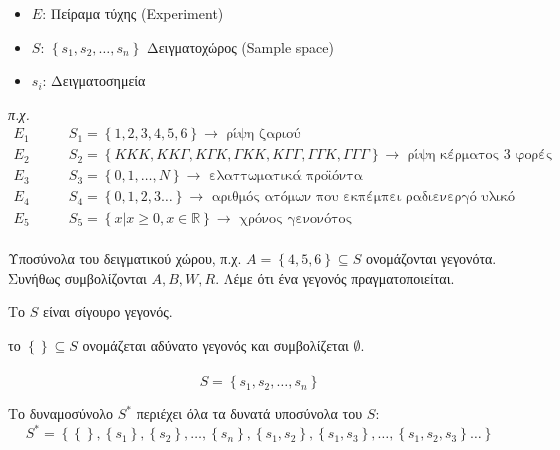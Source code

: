 \documentclass[11pt,a4paper,titlepage,draft]{article}
\newcommand{\textlatin}[1]{#1}
\begin{document}
\begin{itemize}
\item \(E\): Πείραμα τύχης (\textlatin{Experiment})
\item \(S\): \( \left\lbrace s_1,s_2, \dots , s_n \right\rbrace\) Δειγματοχώρος (\textlatin{Sample space})
\item \(s_i\): Δειγματοσημεία
\end{itemize}

\textit{π.χ.}
\begin{align*}
E_1 \qquad & S_1 = \left\lbrace 1,2,3,4,5,6 \right\rbrace \rightarrow \text{ ρίψη ζαριού}\\
E_2 \qquad & S_2 = \left\lbrace KKK, KK\Gamma , K\Gamma K, \Gamma K K, K \Gamma \Gamma, \Gamma \Gamma K, \Gamma \Gamma \Gamma \right\rbrace \rightarrow \text{ ρίψη κέρματος 3 φορές} \\
E_3 \qquad & S_3 = \left\lbrace 0,1,\dots,N \right\rbrace \rightarrow \text{ ελαττωματικά προϊόντα}\\
E_4 \qquad & S_4 = \left\lbrace 0,1,2,3\dots \right\rbrace \rightarrow \text{ αριθμός ατόμων που εκπέμπει ραδιενεργό υλικό}\\
E_5 \qquad & S_5 = \left\lbrace x | x \geq 0, x \in \mathbb R \right\rbrace \rightarrow \text{ χρόνος γενονότος}
\end{align*}

\paragraph{}
Υποσύνολα του δειγματικού χώρου, π.χ. \(A = \left\lbrace 4,5,6 \right\rbrace \subseteq S\) ονομάζονται γεγονότα. Συνήθως συμβολίζονται \(A,B,W,R\). Λέμε ότι ένα γεγονός πραγματοποιείται.

Το \(S\) είναι σίγουρο γεγονός.

το \(\left\lbrace \right\rbrace \subseteq S \) ονομάζεται αδύνατο γεγονός και συμβολίζεται \( \emptyset \).

\paragraph{}
\[S =  \left\lbrace s_1,s_2,\dots,s_n  \right\rbrace \]

Το δυναμοσύνολο \(S^*\) περιέχει όλα τα δυνατά υποσύνολα του \(S\):
\[S^* =  \left\lbrace  \left\lbrace  \right\rbrace,  \left\lbrace s_1 \right\rbrace, \left\lbrace s_2 \right\rbrace, \dots,  \left\lbrace s_n  \right\rbrace,  \left\lbrace s_1,s_2 \right\rbrace, \left\lbrace s_1,s_3 \right\rbrace, \dots,  \left\lbrace s_1,s_2,s_3 \right\rbrace \dots  \right\rbrace \]
\end{document}
